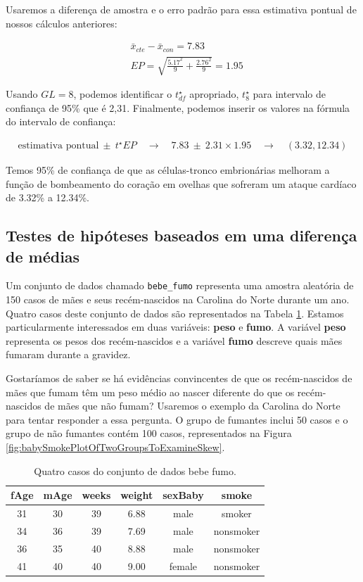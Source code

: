 \documentclass[
]{book}
\theoremstyle{definition}
\theoremstyle{definition}
\theoremstyle{definition}
\theoremstyle{definition}
\theoremstyle{remark}
\begin{document}
Usaremos a diferença de amostra e o erro padrão para essa estimativa pontual de nossos cálculos anteriores:

\begin{align*}
& \bar{x}_{cte} - \bar{x}_{con} = 7.83 \\
& EP = \sqrt{\frac{5.17^2}{9} + \frac{2.76^2}{9}} = 1.95
\end{align*}

Usando \(GL = 8\), podemos identificar o \(t^{\star}_{df}\) apropriado, \(t^{\star}_{8}\) para intervalo de confiança de 95\% que é 2,31. Finalmente, podemos inserir os valores na fórmula do intervalo de confiança:

\begin{align*}
\text{estimativa pontual} \ \pm\ t^{\star}EP \quad\rightarrow\quad
7.83 \ \pm\ 2.31\times 1.95 \quad\rightarrow\quad (3.32, 12.34)
\end{align*}

Temos 95\% de confiança de que as células-tronco embrionárias melhoram a função de bombeamento do coração em ovelhas que sofreram um ataque cardíaco de 3.32\% a 12.34\%.

\hypertarget{HTBasedMeanDifference}{%
\subsection{Testes de hipóteses baseados em uma diferença de médias}\label{HTBasedMeanDifference}}

Um conjunto de dados chamado \texttt{bebe\_fumo} representa uma amostra aleatória de 150 casos de mães e seus recém-nascidos na Carolina do Norte durante um ano. Quatro casos deste conjunto de dados são representados na Tabela \ref{tab:babySmokeDF}. Estamos particularmente interessados em duas variáveis: \textbf{peso} e \textbf{fumo}. A variável \textbf{peso} representa os pesos dos recém-nascidos e a variável \textbf{fumo} descreve quais mães fumaram durante a gravidez.

Gostaríamos de saber se há evidências convincentes de que os recém-nascidos de mães que fumam têm um peso médio ao nascer diferente do que os recém-nascidos de mães que não fumam? Usaremos o exemplo da Carolina do Norte para tentar responder a essa pergunta. O grupo de fumantes inclui 50 casos e o grupo de não fumantes contém 100 casos, representados na Figura \ref{fig:babySmokePlotOfTwoGroupsToExamineSkew}.

\begin{table}

\caption{\label{tab:babySmokeDF}Quatro casos do conjunto de dados bebe fumo.}
\centering
\begin{tabular}[t]{c|c|c|c|c|c}
\hline
fAge & mAge & weeks & weight & sexBaby & smoke\\
\hline
31 & 30 & 39 & 6.88 & male & smoker\\
\hline
34 & 36 & 39 & 7.69 & male & nonsmoker\\
\hline
36 & 35 & 40 & 8.88 & male & nonsmoker\\
\hline
41 & 40 & 40 & 9.00 & female & nonsmoker\\
\hline
\end{tabular}
\end{table}
\end{document}
